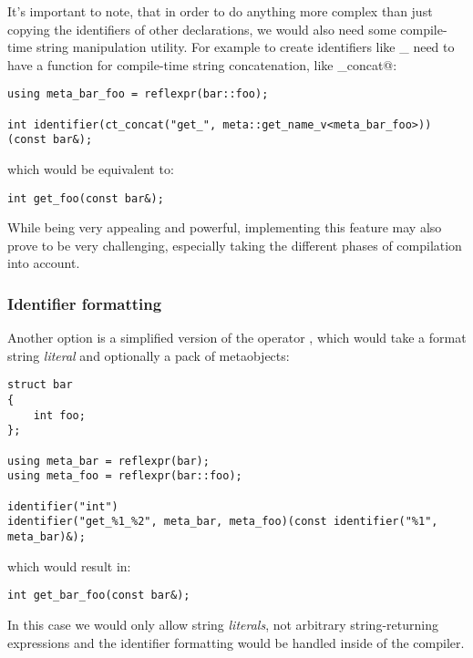 It's important to note, that in order to do anything more complex than just
copying the identifiers of other declarations, we would also need some compile-time
string manipulation utility. For example to create identifiers like
\verb@get_%@ or \verb@set_%@ where \verb@%@ is a declaration name, we would
need to have a function for compile-time string concatenation, like
\verb@ct_concat@:

\begin{verbatim}
using meta_bar_foo = reflexpr(bar::foo);

int identifier(ct_concat("get_", meta::get_name_v<meta_bar_foo>))(const bar&);
\end{verbatim}

which would be equivalent to:

\begin{verbatim}
int get_foo(const bar&);
\end{verbatim}

While being very appealing and powerful, implementing this feature may
also prove to be very challenging, especially taking the different phases
of compilation into account.

\subsubsection{Identifier formatting}

Another option is a simplified version of the operator \verb@identifier@,
which would take a format string {\em literal} and optionally a pack of
 metaobjects:

\begin{verbatim}
struct bar
{
	int foo;
};

using meta_bar = reflexpr(bar);
using meta_foo = reflexpr(bar::foo);

identifier("int")
identifier("get_%1_%2", meta_bar, meta_foo)(const identifier("%1", meta_bar)&);
\end{verbatim}

which would result in:

\begin{verbatim}
int get_bar_foo(const bar&);
\end{verbatim}

In this case we would only allow string {\em literals}, not arbitrary
\verb@constexpr@ string-returning expressions and the identifier formatting
would be handled inside of the compiler.

